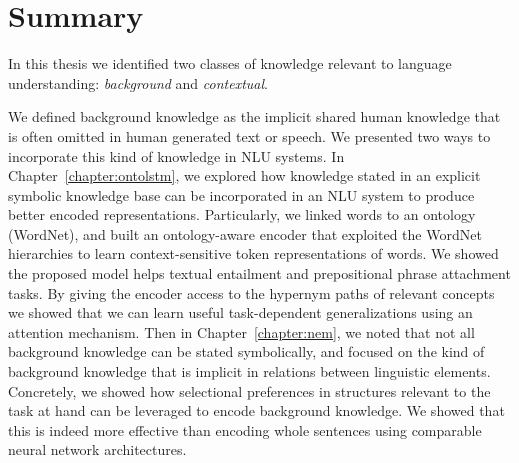 

\section{Summary}
In this thesis we identified two classes of knowledge relevant to language
understanding: \textit{background} and \textit{contextual}.

We defined background knowledge as the implicit shared human knowledge that is
often omitted in human generated text or speech. We presented two ways to
incorporate this kind of knowledge in NLU systems.  In Chapter~\ref{chapter:ontolstm},
we explored how knowledge stated in an explicit symbolic knowledge base can be
incorporated in an NLU system to produce better encoded representations.
Particularly, we linked words to an ontology (WordNet),
and built an ontology-aware encoder that exploited the WordNet
hierarchies to learn context-sensitive token representations of words. We showed
the proposed model helps textual entailment and prepositional phrase attachment
tasks. By giving the encoder access to the hypernym paths of relevant concepts
we showed that we can learn useful task-dependent generalizations using an
attention mechanism.
Then in Chapter~\ref{chapter:nem}, we noted that not all background knowledge
can be stated symbolically, and focused on the kind of background knowledge that
is implicit in relations between linguistic elements. Concretely, we showed how selectional
preferences in structures relevant to the task at hand can be leveraged to
encode background knowledge. We showed that this is indeed more effective than
encoding whole sentences using comparable neural network architectures. 

